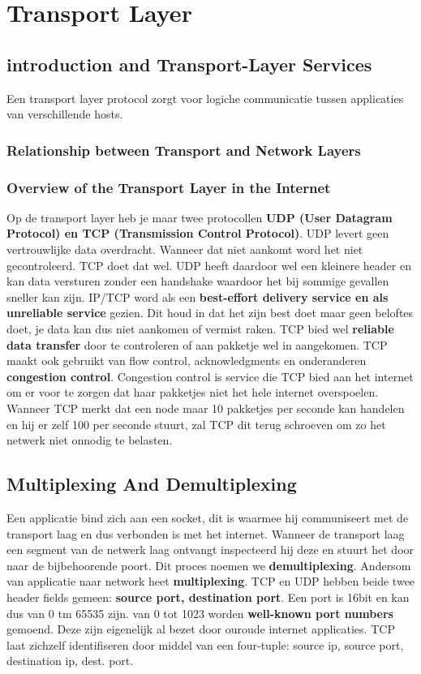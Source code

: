 \section{Transport Layer}
\subsection{introduction and Transport-Layer Services}
Een transport layer protocol zorgt voor logiche communicatie tussen applicaties van verschillende hosts.
\subsubsection{Relationship between Transport and Network Layers}
\subsubsection{Overview of the Transport Layer in the Internet}
Op de transport layer heb je maar twee protocollen \textbf{UDP (User Datagram Protocol) en TCP (Transmission Control Protocol)}. UDP levert geen vertrouwlijke data overdracht. Wanneer dat niet aankomt word het niet gecontroleerd. TCP doet dat wel. UDP heeft daardoor wel een kleinere header en kan data versturen zonder een handshake waardoor het bij sommige gevallen sneller kan zijn.
\newline
IP/TCP word als een \textbf{best-effort delivery service en als unreliable service} gezien. Dit houd in dat het zijn best doet maar geen beloftes doet, je data kan dus niet aankomen of vermist raken. TCP bied wel \textbf{reliable data transfer} door te controleren of aan pakketje wel in aangekomen. TCP maakt ook gebruikt van flow control, acknowledgments en onderanderen \textbf{congestion control}. Congestion control is service die TCP bied aan het internet om er voor te zorgen dat haar pakketjes niet het hele internet overspoelen. Wanneer TCP merkt dat een node maar 10 pakketjes per seconde kan handelen en hij er zelf 100 per seconde stuurt, zal TCP dit terug schroeven om zo het netwerk niet onnodig te belasten.

\subsection{Multiplexing And Demultiplexing}
Een applicatie bind zich aan een socket, dit is waarmee hij communiseert met de transport laag en dus verbonden is met het internet.
\newline
Wanneer de transport laag een segment van de netwerk laag ontvangt inspecteerd hij deze en stuurt het door naar de bijbehoorende poort. Dit proces noemen we \textbf{demultiplexing}. Andersom van applicatie naar network heet \textbf{multiplexing}.
\newline
TCP en UDP hebben beide twee header fields gemeen: \textbf{source port, destination port}. Een port is 16bit en kan dus van 0 tm 65535 zijn. van 0 tot 1023 worden \textbf{well-known port numbers} gemoend. Deze zijn eigenelijk al bezet door ouroude internet applicaties.
TCP laat zichzelf identifiseren door middel van een four-tuple: source ip, source port, destination ip, dest. port.
